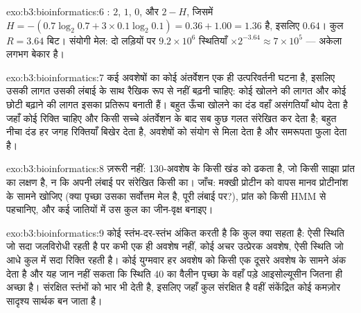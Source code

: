\begin{solution}{exo:b3:bioinformatics:6}
: $2$, $1$, $0$, और $2 - H$, जिसमें $H = -(0.7\log_{2}
0.7 + 3\times 0.1\log_{2} 0.1) = 0.36 + 1.00 = 1.36$ है, इसलिए $0.64$। कुल
$R = 3.64$ बिट। संयोगी मेल: दो लड़ियों पर $9.2\times 10^{6}$ स्थितियाँ
$\times 2^{-3.64} \approx 7\times 10^{5}$ ---  अकेला लगभग बेकार है।
\end{solution}

\begin{solution}{exo:b3:bioinformatics:7}
कई अवशेषों का कोई अंतर्वेशन एक ही उत्परिवर्तनी घटना है, इसलिए उसकी लागत
उसकी लंबाई के साथ रैखिक रूप से नहीं बढ़नी चाहिए: कोई खोलने की लागत और
कोई छोटी बढ़ाने की लागत इसका प्रतिरूप बनाती हैं। बहुत ऊँचा खोलने का दंड
वहाँ असंगतियाँ थोप देता है जहाँ कोई रिक्ति चाहिए और किसी सच्चे
अंतर्वेशन के बाद सब कुछ गलत संरेखित कर देता है; बहुत नीचा दंड हर जगह
रिक्तियाँ बिखेर देता है, अवशेषों को संयोग से मिला देता है और समरूपता
फुला देता है।
\end{solution}

\begin{solution}{exo:b3:bioinformatics:8}
ज़रूरी नहीं:  \num{130}-अवशेष के किसी खंड को ढकता है, जो किसी
साझा प्रांत का लक्षण है, न कि अपनी लंबाई पर संरेखित किसी  का।
जाँच: मक्खी प्रोटीन को वापस मानव प्रोटीनांश के सामने खोजिए (क्या पृच्छा
उसका सर्वोत्तम मेल है, पूरी लंबाई पर?), प्रांत को किसी  HMM से
पहचानिए, और कई जातियों में उस कुल का जीन-वृक्ष बनाइए।
\end{solution}

\begin{solution}{exo:b3:bioinformatics:9}
कोई  स्तंभ-दर-स्तंभ अंकित करती है कि कुल क्या सहता है: ऐसी
स्थिति जो सदा जलविरोधी रहती है पर कभी एक ही अवशेष नहीं, कोई अचर
उत्प्रेरक अवशेष, ऐसी स्थिति जो आधे कुल में सदा रिक्ति रहती है। कोई
युग्मवार  हर अवशेष को किसी एक दूसरे अवशेष के सामने अंक देता है और
यह जान नहीं सकता कि स्थिति 40 का वैलीन पृच्छा के वहाँ पड़े आइसोल्यूसीन
जितना ही अच्छा है।  संरक्षित स्तंभों को भार भी देती है, इसलिए
जहाँ कुल संरक्षित है वहीं संकेंद्रित कोई कमज़ोर सादृश्य सार्थक बन जाता है।
\end{solution}

